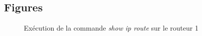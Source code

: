 \subsection{Figures}

\begin{figure}[!h]
	\begin{center}
		
		\caption{Exécution de la commande \emph{show ip route} sur le routeur 1}
	\end{center}
\end{figure}
